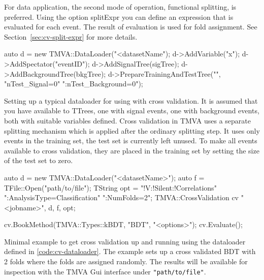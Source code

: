 For data application, the second mode of operation, functional splitting, is preferred. Using the option splitExpr you can define an expression that is evaluated for each event. The result of evaluation is used for fold assignment. See Section~\ref{sec:cv-split-expr} for more details.

\begin{codeexample}
\begin{tmvacode}
auto d = new TMVA::DataLoader("<datasetName");
d->AddVariable("x");
d->AddSpectator("eventID");
d->AddSignalTree(sigTree);
d->AddBackgroundTree(bkgTree);
d->PrepareTrainingAndTestTree("", "nTest_Signal=0"
                                  ":nTest_Background=0");
\end{tmvacode}
\caption[.]{\codeexampleCaptionSize
Setting up a typical dataloader for using with cross validation. It is assumed that you have available to TTrees, one with signal events, one with background events, both with suitable variables defined.
Cross validation in TMVA uses a separate splitting mechanism which is applied after the ordinary splitting step. It uses only events in the training set, the test set is currently left unused. To make all events available to cross validation, they are placed in the training set by setting the size of the test set to zero.
}
\label{code:cv-dataloader}
\end{codeexample}

\begin{codeexample}
\begin{tmvacode}
auto d = new TMVA::DataLoader("<datasetName>");
auto f = TFile::Open("path/to/file");
TString opt = "!V:!Silent:!Correlations"
              ":AnalysisType=Classification"
              ":NumFolds=2";
TMVA::CrossValidation cv {"<jobname>", d, f, opt};

cv.BookMethod(TMVA::Types::kBDT, "BDT", "<options>");
cv.Evaluate();
\end{tmvacode}
\caption[.]{\codeexampleCaptionSize Minimal example to get cross validation up and running using the dataloader defined in \ref{code:cv-dataloader}. The example sets up a cross validated BDT with 2 folds where the folds are assigned randomly. The results will be available for inspection with the TMVA Gui interface under \texttt{"path/to/file"}.}
\label{code:cv-minimal}
\end{codeexample}











